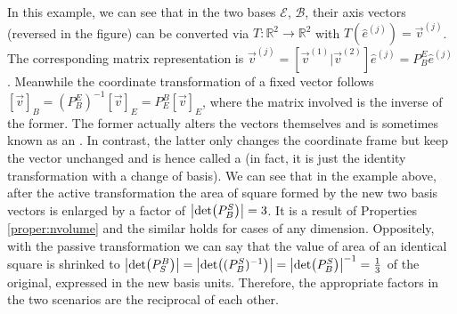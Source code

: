 \begin{solution}
\begin{figure}
\end{figure}
\end{solution}
In this example, we can see that in the two bases $\mathcal{E}$, $\mathcal{B}$, their axis vectors (reversed in the figure) can be converted via $T: \mathbb{R}^2 \to \mathbb{R}^2$ with $T(\hat{e}^{(j)}) = \vec{v}^{(j)}$. The corresponding matrix representation is $\vec{v}^{(j)} = [\vec{v}^{(1)}|\vec{v}^{(2)}]\hat{e}^{(j)} = P_B^E\hat{e}^{(j)}$. Meanwhile the coordinate transformation of a fixed vector follows $[\vec{v}]_B = (P_B^E)^{-1}[\vec{v}]_E = P_E^B[\vec{v}]_E$, where the matrix involved is the inverse of the former. The former actually alters the vectors themselves and is sometimes known as an . In contrast, the latter only changes the coordinate frame but keep the vector unchanged and is hence called a  (in fact, it is just the identity transformation with a change of basis). We can see that in the example above, after the active transformation the area of square formed by the new two basis vectors is enlarged by a factor of $\abs{\det(P_B^S)}=3$. It is a result of Properties \ref{proper:nvolume} and the similar holds for cases of any dimension. Oppositely, with the passive transformation we can say that the value of area of an identical square is shrinked to $\abs{\det(P_S^B)} = \abs{\det((P_B^S)^{-1})} = \abs{\det(P_B^S)}^{-1} = \frac{1}{3}$ of the original, expressed in the new basis units. Therefore, the appropriate factors in the two scenarios are the reciprocal of each other.

